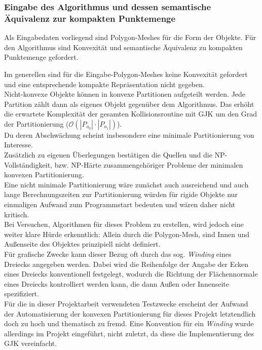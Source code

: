 \subsubsection{Eingabe des Algorithmus und dessen semantische Äquivalenz zur kompakten Punktemenge}
\label{sec:gjk_equiv}
Als Eingabedaten vorliegend sind Polygon-Meshes für die Form der Objekte.
Für den Algorithmus sind Konvexität und semantische Äquivalenz zu kompakten Punktemenge gefordert.

Im generellen sind für die Eingabe-Polygon-Meshes keine Konvexität gefordert und eine entsprechende kompakte Repräsentation nicht gegeben.\\
Nicht-konvexe Objekte können in konvexe Partitionen aufgeteilt werden. Jede Partition zählt dann als eigenes Objekt gegenüber dem Algorithmus. Das erhöht die erwartete Komplexität der gesamten Kollisionsroutine mit GJK um den Grad der Partitionierung ($\mathcal{O}(|P_{o_0}|\cdot |P_{o_1}|)$).\\
Du deren Abschwächung scheint insbesondere eine minimale Partitionierung von Interesse.\\
Zusätzlich zu eigenen Überlegungen bestätigen die Quellen \cite{ARTIGAS20111968} und \cite{grelier2019minimum} die NP-Vollständigkeit, bzw. NP-Härte zusammengehöriger Probleme der minimalen konvexen Partitionierung.\\
Eine nicht minimale Partitionierung wäre zunächst auch ausreichend und auch lange Berechnungszeiten zur Partitionierung würden für rigide Objekte nur einmaligen Aufwand zum Programmstart bedeuten und wären daher nicht kritisch.\\
Bei Versuchen, Algorithmen für dieses Problem zu erstellen, wird jedoch eine weiter klare Hürde erkenntlich: Allein durch die Polygon-Mesh, sind Innen und Außenseite des Objektes prinzipiell nicht definiert.\\
Für grafische Zwecke kann dieser Bezug oft durch das sog. \textit{Winding} \cite[ch.5.6, p.121, ch.7.3]{fourcrossfour} eines Dreiecks angegeben werden. Dabei wird die Reihenfolge der Angabe der Ecken eines Dreiecks konventionell festgelegt, wodurch die Richtung der Flächennormale eines Dreiecks kontrolliert werden kann, die dann Außen oder Innenseite spezifiziert.\\
Für die in dieser Projektarbeit verwendeten Testzwecke erscheint der Aufwand der Automatisierung der konvexen Partitionierung für dieses Projekt letztendlich doch zu hoch und thematisch zu fremd. Eine Konvention für ein \textit{Winding} wurde allerdings im Projekt eingeführt, nicht zuletzt, da diese die Implementierung des GJK vereinfacht.

